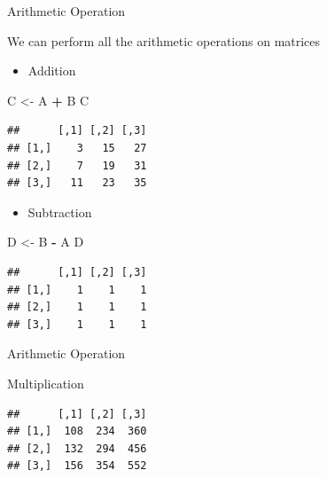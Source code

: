 \documentclass[
  ignorenonframetext,
]{beamer}
\newenvironment{Shaded}{\begin{snugshade}}{\end{snugshade}}
\newcommand{\NormalTok}[1]{#1}
\newcommand{\OperatorTok}[1]{\textcolor[rgb]{0.81,0.36,0.00}{\textbf{#1}}}
\newcommand{\StringTok}[1]{\textcolor[rgb]{0.31,0.60,0.02}{#1}}
\providecommand{\tightlist}{%
  \setlength{\itemsep}{0pt}\setlength{\parskip}{0pt}}
\begin{document}
\begin{frame}[fragile]{Arithmetic Operation}
\protect\hypertarget{arithmetic-operation}{}

We can perform all the arithmetic operations on matrices

\begin{itemize}
\tightlist
\item
  Addition
\end{itemize}

\begin{Shaded}
\begin{Highlighting}[]
\NormalTok{C <-}\StringTok{ }\NormalTok{A }\OperatorTok{+}\StringTok{ }\NormalTok{B}
\NormalTok{C}
\end{Highlighting}
\end{Shaded}

\begin{verbatim}
##      [,1] [,2] [,3]
## [1,]    3   15   27
## [2,]    7   19   31
## [3,]   11   23   35
\end{verbatim}

\begin{itemize}
\tightlist
\item
  Subtraction
\end{itemize}

\begin{Shaded}
\begin{Highlighting}[]
\NormalTok{D <-}\StringTok{ }\NormalTok{B }\OperatorTok{-}\StringTok{ }\NormalTok{A}
\NormalTok{D}
\end{Highlighting}
\end{Shaded}

\begin{verbatim}
##      [,1] [,2] [,3]
## [1,]    1    1    1
## [2,]    1    1    1
## [3,]    1    1    1
\end{verbatim}

\end{frame}

\begin{frame}[fragile]{Arithmetic Operation}
\protect\hypertarget{arithmetic-operation-1}{}

\begin{block}{Multiplication}

\begin{Shaded}
\end{Shaded}

\begin{verbatim}
##      [,1] [,2] [,3]
## [1,]  108  234  360
## [2,]  132  294  456
## [3,]  156  354  552
\end{verbatim}

\end{block}

\end{frame}
\end{document}
